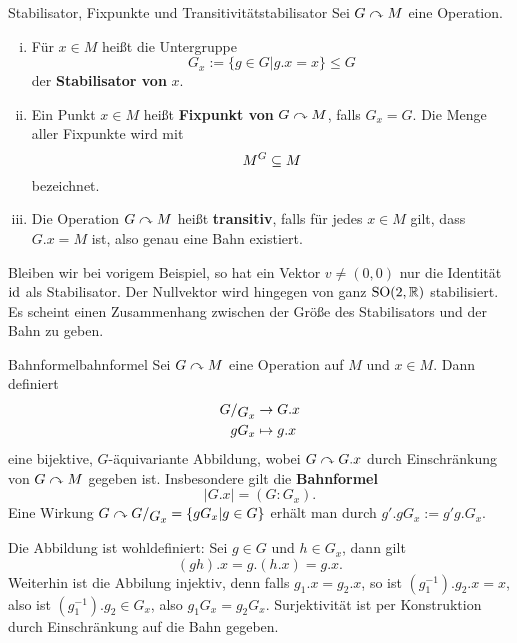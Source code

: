 \begin{definition}{Stabilisator, Fixpunkte und Transitivität}{stabilisator}
Sei $G \curvearrowright M$ eine Operation. 
\begin{enumerate}[(i)]
\item Für $x \in M$ heißt die Untergruppe
\begin{equation}
G_x := \{g \in G | g.x =x\} \leq G
\end{equation}
der \textbf{Stabilisator von} $x$.
\item Ein Punkt $x \in M$ heißt \textbf{Fixpunkt von} $G \curvearrowright M$, falls $G_x = G$. Die Menge aller Fixpunkte wird mit 
\begin{equation}
M^G \subseteq M
\end{equation}
bezeichnet.
\item Die Operation $G \curvearrowright M$ heißt \textbf{transitiv}, falls für jedes $x \in M$ gilt, dass $G.x = M$ ist, also genau eine Bahn existiert.
\end{enumerate}
\end{definition}
\begin{beispiel}
Bleiben wir bei vorigem Beispiel, so hat ein Vektor $v \neq (0,0)$ nur die Identität $\text{id}$ als Stabilisator. Der Nullvektor wird hingegen von ganz $\text{SO}(2,\mathbb{R})$ stabilisiert. Es scheint einen Zusammenhang zwischen der Größe des Stabilisators und der Bahn zu geben.
\end{beispiel}
\begin{satz}{Bahnformel}{bahnformel}
Sei $G\curvearrowright M$ eine Operation auf $M$ und $x \in M$. Dann definiert 
\begin{equation}
\begin{split}
\quotient{G}{G_x} &\to G.x\\
gG_x &\mapsto  g.x
\end{split}
\end{equation}
eine bijektive, $G$-äquivariante Abbildung, wobei $G \curvearrowright G.x$ durch Einschränkung von $G\curvearrowright M$ gegeben ist. Insbesondere gilt die \textbf{Bahnformel}
\begin{equation}
|G.x| = (G : G_x).
\end{equation}
Eine Wirkung $G \acts \quotient{G}{G_x} = \{gG_x|g \in G\}$ erhält man durch $g' . gG_x:= g'g.G_x$.
\end{satz}
\begin{beweis}
Die Abbildung ist wohldefiniert: Sei $g \in G$ und $h \in G_x$, dann gilt
\begin{equation}
(gh).x = g.(h.x) = g.x.
\end{equation}
Weiterhin ist die Abbilung injektiv, denn falls $g_1.x = g_2.x$, so ist $(g_1^{-1}).g_2.x = x$, also ist $(g_1^{-1}).g_2 \in G_x$, also $g_1G_x = g_2G_x$. Surjektivität ist per Konstruktion durch Einschränkung auf die Bahn gegeben.
\end{beweis}

